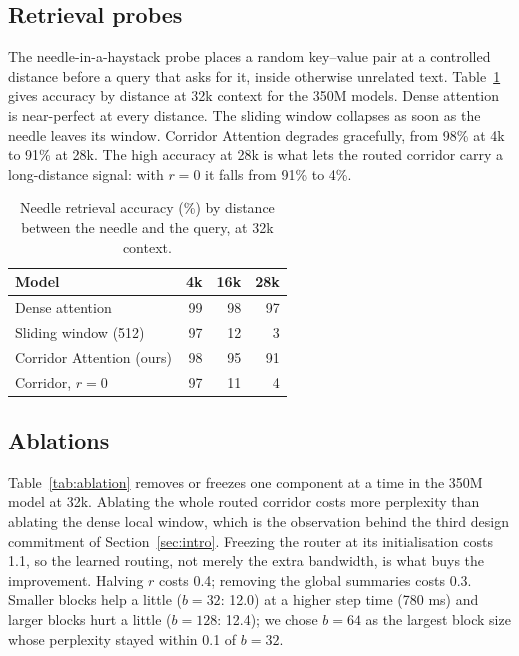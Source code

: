 \documentclass[11pt]{article}
\begin{document}
\subsection{Retrieval probes}\label{sec:probes}

The needle-in-a-haystack probe places a random key--value pair at a
controlled distance before a query that asks for it, inside otherwise
unrelated text. Table~\ref{tab:needle} gives accuracy by distance at 32k
context for the 350M models. Dense attention is near-perfect at every
distance. The sliding window collapses as soon as the needle leaves its
window. Corridor Attention degrades gracefully, from 98\% at 4k to 91\% at
28k. The high accuracy at 28k is what lets the routed corridor carry a
long-distance signal: with $r = 0$ it falls from 91\% to 4\%.

\begin{table}[t]
  \centering
  \begin{tabular}{lrrr}
    \toprule
    Model & 4k & 16k & 28k \\
    \midrule
    Dense attention           & 99 & 98 & 97 \\
    Sliding window (512)      & 97 & 12 &  3 \\
    Corridor Attention (ours) & 98 & 95 & 91 \\
    Corridor, $r = 0$         & 97 & 11 &  4 \\
    \bottomrule
  \end{tabular}
  \caption{Needle retrieval accuracy (\%) by distance between the needle and
    the query, at 32k context.}
  \label{tab:needle}
\end{table}

\subsection{Ablations}\label{sec:ablations}

Table~\ref{tab:ablation} removes or freezes one component at a time in the
350M model at 32k. Ablating the whole routed corridor costs more perplexity
than ablating the dense local window, which is the observation behind the
third design commitment of Section~\ref{sec:intro}.
Freezing the router at its initialisation costs 1.1, so the learned routing,
not merely the extra bandwidth, is what buys the improvement. Halving $r$
costs 0.4; removing the global summaries costs 0.3. Smaller blocks help a
little ($b = 32$: 12.0) at a higher step time (780 ms) and larger blocks
hurt a little ($b = 128$: 12.4); we chose $b = 64$ as the largest block size
whose perplexity stayed within 0.1 of $b = 32$.
\end{document}
